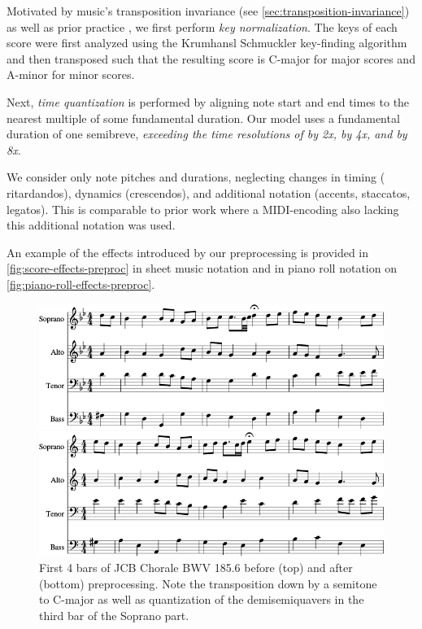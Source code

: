 Motivated by music's transposition invariance (see
\vref{sec:transposition-invariance}) as well as prior practice
\citep{mozer1994neural,Eck2002,franklin2004recurrent,franklin2005jazz}, we
first perform \emph{key normalization}. The keys of each score were first
analyzed using the Krumhansl Schmuckler key-finding algorithm
\citep{krumhansl2001cognitive} and then transposed such that the resulting
score is C-major for major scores and A-minor for minor scores.

Next, \emph{time quantization} is performed by aligning note start and end
times to the nearest multiple of some fundamental duration. Our model uses a
fundamental duration of one semibreve, \emph{exceeding the time resolutions of
\citep{Boulanger-Lewandowski2012,Eck2002} by 2x, \citep{hild1991harmonet} by
4x, and \citep{bellgard1994harmonizing} by 8x}.

We consider only note pitches and durations, neglecting changes in timing (\eg
ritardandos), dynamics (\eg crescendos), and additional notation (\eg accents,
staccatos, legatos). This is comparable to prior work
\citep{Boulanger-Lewandowski2012,pascanu2013construct} where a MIDI-encoding
also lacking this additional notation was used.

An example of the effects introduced by our preprocessing is provided in
\vref{fig:score-effects-preproc} in sheet music notation and in piano roll
notation on \vref{fig:piano-roll-effects-preproc}.
\begin{figure}[tb]
    \centering
    \includegraphics[width=0.8\linewidth]{bwv185-6-original-score-1.png}

    \vspace{1.5cm}

    \includegraphics[width=0.8\linewidth]{bwv185-6-preproc-score-1.png}
    \caption{First 4 bars of JCB Chorale BWV 185.6 before (top) and after
      (bottom) preprocessing. Note the transposition down by a semitone to
      C-major as well as quantization of the demisemiquavers in the third bar of
    the Soprano part.}
    \label{fig:score-effects-preproc}
\end{figure}

